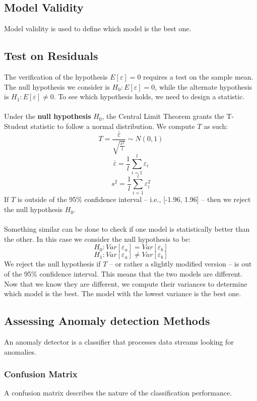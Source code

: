 \documentclass{article}
\begin{document}
\subsection{Model Validity}
Model validity is used to define which model is the best one.

\subsection{Test on Residuals}
The verification of the hypothesis $E[\varepsilon] = 0$ requires a test on the sample mean. The null hypothesis we consider is $H_0 : E[\varepsilon] = 0$, while the alternate hypothesis is $H_1 : E[\varepsilon] \not = 0$. To see which hypothesis holds, we need to design a statistic. \\ \\
Under the \textbf{null hypothesis} $H_0$, the Central Limit Theorem grants the T-Student statistic to follow a normal distribution. We compute $T$ as such:
\[ T = \frac{\bar \varepsilon}{\sqrt{\frac{s^2}{l}}} \sim N(0,1) \]
\[ \bar\varepsilon = \frac{1}{l} \sum^l_{i = 1} \varepsilon_i \]
\[ s^2 = \frac{1}{l} \sum^l_{i = 1} \varepsilon^2_i \]
If $T$ is outside of the 95\% confidence interval -- i.e., [-1.96, 1.96] -- then we reject the null hypothesis $H_0$. \\ \\
Something similar can be done to check if one model is statistically better than the other. In this case we consider the null hypothesis to be:
\[ H_0 : Var[\varepsilon_a] = Var[\varepsilon_b] \]
\[ H_1 : Var[\varepsilon_a] \not = Var[\varepsilon_b] \]
We reject the null hypothesis if $T$ -- or rather a slightly modified version -- is out of the 95\% confidence interval. This means that the two models are different. Now that we know they are different, we compute their variances to determine which model is the best. The model with the lowest variance is the best one.

\subsection{Assessing Anomaly detection Methods}
An anomaly detector is a classifier that processes data streams looking for anomalies.

\subsubsection{Confusion Matrix}
A confusion matrix describes the nature of the classification performance.
\end{document}
